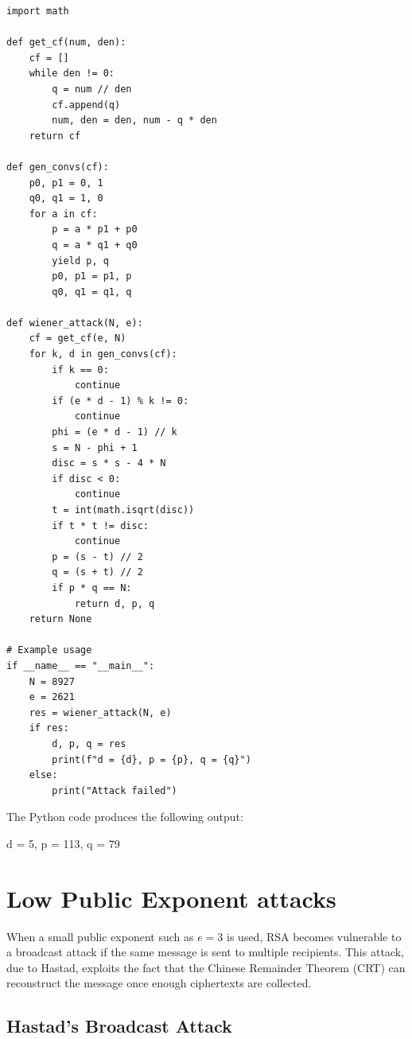 \begin{lstlisting}[style=pythonstyle, title=Wiener attack implementation, label=lst:wiener]
import math

def get_cf(num, den):
    cf = []
    while den != 0:
        q = num // den
        cf.append(q)
        num, den = den, num - q * den
    return cf

def gen_convs(cf):
    p0, p1 = 0, 1
    q0, q1 = 1, 0
    for a in cf:
        p = a * p1 + p0
        q = a * q1 + q0
        yield p, q
        p0, p1 = p1, p
        q0, q1 = q1, q

def wiener_attack(N, e):
    cf = get_cf(e, N)
    for k, d in gen_convs(cf):
        if k == 0:
            continue
        if (e * d - 1) % k != 0:
            continue
        phi = (e * d - 1) // k
        s = N - phi + 1
        disc = s * s - 4 * N
        if disc < 0:
            continue
        t = int(math.isqrt(disc))
        if t * t != disc:
            continue
        p = (s - t) // 2
        q = (s + t) // 2
        if p * q == N:
            return d, p, q
    return None

# Example usage
if __name__ == "__main__":
    N = 8927
    e = 2621
    res = wiener_attack(N, e)
    if res:
        d, p, q = res
        print(f"d = {d}, p = {p}, q = {q}")
    else:
        print("Attack failed")
\end{lstlisting}
\vspace{2 em}
The Python code produces the following output:


\begin{tcolorbox}[colback=gray!10, colframe=gray!40, arc=2mm, boxrule=0.5pt]
\ttfamily
d = 5, p = 113, q = 79
\end{tcolorbox}

\section{Low Public Exponent attacks}

When a small public exponent such as \(e = 3\) is used, RSA becomes vulnerable to a broadcast attack if the same message is sent to multiple recipients. This attack, due to Hastad, exploits the fact that the Chinese Remainder Theorem (CRT) can reconstruct the message once enough ciphertexts are collected.

\subsection{Hastad's Broadcast Attack}

